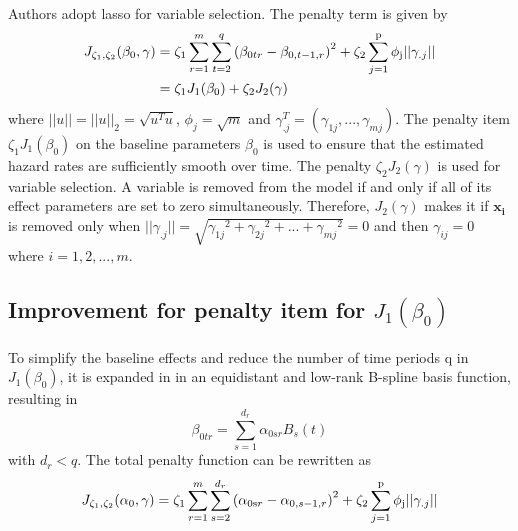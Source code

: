 \documentclass[]{article}
\begin{document}
    Authors adopt lasso for variable selection. The penalty term  is given by
    \begin{equation}
    \begin{split}
    {J_{{\zeta _1},{\zeta _2}}}({\beta _0},\gamma ) &= {\zeta _1}\sum\limits_{r = 1}^m {\sum\limits_{t = 2}^q {{{({\beta _{0tr}} - {\beta _{0,t - 1,r}})}^2}} }  + {\zeta _2}\sum\limits_{j = 1}^{\rm{p}} {{\phi _{\rm{j}}}||{\gamma _{.j}}||} \\
    & = {\zeta _1}{J_1}({\beta _0}) + {\zeta _2}{J_2}(\gamma )
    \end{split}
    \end{equation}
    where $||u|| = ||u|{|_2} = \sqrt {{u^T}u}$, $ {\phi _j} = \sqrt m $ and $\gamma _{.j}^T=(\gamma _{1j},...,\gamma _{mj})$. The penalty item ${\zeta _1}{J_1}({\beta _0})$ on the baseline parameters $\beta_0$ is used to ensure that the estimated hazard rates are sufficiently smooth over time. The penalty ${\zeta _2}{J_2}(\gamma )$ is used for variable selection. A variable is removed from the model if and only if all of its effect parameters are set to zero simultaneously. Therefore, ${J_2}(\gamma ) $ makes it if $\mathbf{x_i}$ is removed only when $||{\gamma _{.j}}|| = \sqrt {{\gamma _{1j}}^2 + {\gamma _{2j}}^2 + ... + {\gamma _{mj}}^2}  = 0$ and then $\gamma _{ij}=0 $ where $i=1,2,...,m$.
    
    \subsection{Improvement for penalty item for ${J_1}(\beta_0 )$}
    \paragraph{}
    To simplify the baseline effects and reduce the number of time periods q in ${J_1}(\beta_0 )$, it is expanded in in an equidistant and  low-rank B-spline basis function, resulting in
    \begin{equation}
    {\beta _{0tr}} = \sum\limits_{s = 1}^{{d_r}} {{\alpha _{0sr}}{B_s}(t)}
    \end{equation}
    with $d_r < q$. The total penalty function can be rewritten as
    \begin{equation}
    {J_{{\zeta _1},{\zeta _2}}}({\alpha _0},\gamma ) = {\zeta _1}\sum\limits_{r = 1}^m {\sum\limits_{s = 2}^{{d_r}} {{{({\alpha _{0{\rm{s}}r}} - {\alpha _{0,s - 1,r}})}^2}} }  + {\zeta _2}\sum\limits_{j = 1}^{\rm{p}} {{\phi _{\rm{j}}}||{\gamma _{.j}}||}
    \end{equation}
    
\end{document}
